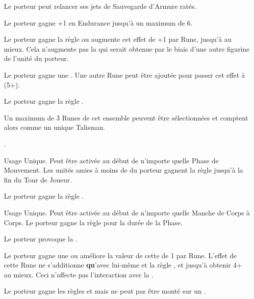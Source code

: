 \begin{multicols}{2}
Le porteur peut relancer ses jets de Sauvegarde d'Armure ratés.

Le porteur gagne +1 en Endurance jusqu'à un maximum de 6.

Le porteur gagne la règle  ou augmente cet effet de +1 par Rune, jusqu'à  au mieux. Cela n'augmente pas la \magicresistance{} qui serait obtenue par le biais d'une autre figurine de l'unité du porteur.

 Le porteur gagne une . Une autre Rune peut être ajoutée pour passer cet effet à (5+).

 Le porteur gagne la règle .

\endpricelist

\columnbreak
\subtitle{Runes de Talisman}\vspace{5pt}

Un maximum de 3 Runes de cet ensemble peuvent être sélectionnées et comptent alors comme un unique Talisman.

\startpricelist

\oneperarmy{}.

Usage Unique. Peut être activée au début de n'importe quelle Phase de Mouvement. Les unités amies à moins de  du porteur gagnent la règle \devastatingcharge{} jusqu'à la fin du Tour de Joueur.

Le porteur gagne la règle .

Usage Unique. Peut être activée au début de n'importe quelle Manche de Corps à Corps. Le porteur gagne la règle \stubborn{} pour la durée de la Phase.

Le porteur provoque la \fear{}.

Le porteur gagne une  ou améliore la valeur de cette \wardsave{} de 1 par Rune. L'effet de cette Rune ne s'additionne \textbf{qu}'avec lui-même et la règle \shieldwall{}, et jusqu'à obtenir 4+ au mieux. Ceci n'affecte pas l'interaction avec la \magicresistance{}.

Le porteur gagne les règles \vanguard{} et \scout{} mais ne peut pas être monté sur un \warthrone{}.


\end{multicols}

